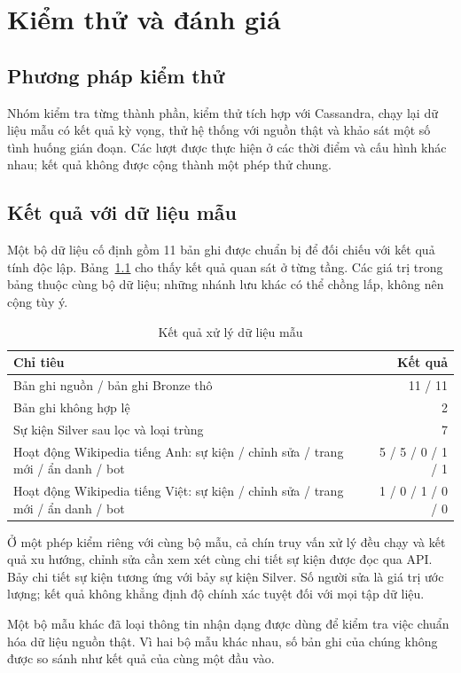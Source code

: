 \chapter{Kiểm thử và đánh giá}\label{chap:danhgia}
\section{Phương pháp kiểm thử}
Nhóm kiểm tra từng thành phần, kiểm thử tích hợp với Cassandra, chạy lại dữ liệu mẫu có kết quả kỳ vọng, thử hệ thống với nguồn thật và khảo sát một số tình huống gián đoạn. Các lượt được thực hiện ở các thời điểm và cấu hình khác nhau; kết quả không được cộng thành một phép thử chung.
\section{Kết quả với dữ liệu mẫu}
Một bộ dữ liệu cố định gồm 11 bản ghi được chuẩn bị để đối chiếu với kết quả tính độc lập. Bảng~\ref{tab:mau} cho thấy kết quả quan sát ở từng tầng. Các giá trị trong bảng thuộc cùng bộ dữ liệu; những nhánh lưu khác có thể chồng lấp, không nên cộng tùy ý.
\begin{table}[H]\centering\small
\caption{Kết quả xử lý dữ liệu mẫu}\label{tab:mau}
\begin{tabularx}{\linewidth}{@{}Xr@{}}\toprule
\textbf{Chỉ tiêu} & \textbf{Kết quả} \\ \midrule
Bản ghi nguồn / bản ghi Bronze thô & 11 / 11 \\
Bản ghi không hợp lệ & 2 \\
Sự kiện Silver sau lọc và loại trùng & 7 \\
Hoạt động Wikipedia tiếng Anh: sự kiện / chỉnh sửa / trang mới / ẩn danh / bot & 5 / 5 / 0 / 1 / 1 \\
Hoạt động Wikipedia tiếng Việt: sự kiện / chỉnh sửa / trang mới / ẩn danh / bot & 1 / 0 / 1 / 0 / 0 \\
\bottomrule\end{tabularx}\end{table}
Ở một phép kiểm riêng với cùng bộ mẫu, cả chín truy vấn xử lý đều chạy và kết quả xu hướng, chỉnh sửa cần xem xét cùng chi tiết sự kiện được đọc qua API. Bảy chi tiết sự kiện tương ứng với bảy sự kiện Silver. Số người sửa là giá trị ước lượng; kết quả không khẳng định độ chính xác tuyệt đối với mọi tập dữ liệu.

Một bộ mẫu khác đã loại thông tin nhận dạng được dùng để kiểm tra việc chuẩn hóa dữ liệu nguồn thật. Vì hai bộ mẫu khác nhau, số bản ghi của chúng không được so sánh như kết quả của cùng một đầu vào.
